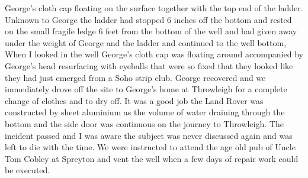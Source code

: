 George's cloth cap floating on the surface together with the top end of the
ladder.  Unknown to George the ladder had stopped 6 inches off the bottom and
rested on the small fragile ledge 6 feet from the bottom of the well and had
given away under the weight of George and the ladder and continued to the well
bottom,   When I looked in the well George's cloth cap was floating around
accompanied by George's head resurfacing with eyeballs that were so fixed that
they looked like they had just emerged from a Soho strip club.  George
recovered and we immediately drove off the site to George's home at Throwleigh
for a complete change of clothes and to dry off.  It was a good job the Land
Rover was constructed by sheet aluminium as the volume of water draining
through the bottom and the side door was continuous on the journey to
Throwleigh. The incident passed and I was aware the subject was never discussed
again and was left to die with the time.  We were instructed to attend the age
old pub of Uncle Tom Cobley at Spreyton and vent the well when a few days of
repair work could be executed.
